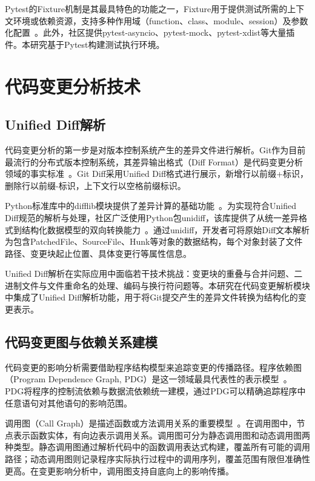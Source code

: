 Pytest的Fixture机制是其最具特色的功能之一，Fixture用于提供测试所需的上下文环境或依赖资源，支持多种作用域（function、class、module、session）及参数化配置~\cite{pytestOfficial}。此外，社区提供pytest-asyncio、pytest-mock、pytest-xdist等大量插件。本研究基于Pytest构建测试执行环境。

\section{代码变更分析技术}
\subsection{Unified Diff解析}
代码变更分析的第一步是对版本控制系统产生的差异文件进行解析。Git作为目前最流行的分布式版本控制系统，其差异输出格式（Diff Format）是代码变更分析领域的事实标准~\cite{ChaconStraub2014}。Git Diff采用Unified Diff格式进行展示，新增行以前缀\textsf{+}标识，删除行以前缀\textsf{-}标识，上下文行以空格前缀标识。

Python标准库中的\textsf{difflib}模块提供了差异计算的基础功能~\cite{PythonDifflib}。为实现符合Unified Diff规范的解析与处理，社区广泛使用Python包\textsf{unidiff}，该库提供了从统一差异格式到结构化数据模型的双向转换能力~\cite{unidiffLibrary}。通过\textsf{unidiff}，开发者可将原始Diff文本解析为包含\textsf{PatchedFile}、\textsf{SourceFile}、\textsf{Hunk}等对象的数据结构，每个对象封装了文件路径、变更块起止位置、具体变更行等属性信息。

Unified Diff解析在实际应用中面临若干技术挑战：变更块的重叠与合并问题、二进制文件与文件重命名的处理、编码与换行符问题等。本研究在代码变更解析模块中集成了Unified Diff解析功能，用于将Git提交产生的差异文件转换为结构化的变更表示。

\subsection{代码变更图与依赖关系建模}
代码变更的影响分析需要借助程序结构模型来追踪变更的传播路径。程序依赖图（Program Dependence Graph, PDG）是这一领域最具代表性的表示模型~\cite{Ferrante1987}。PDG将程序的控制流依赖与数据流依赖统一建模，通过PDG可以精确追踪程序中任意语句对其他语句的影响范围。

调用图（Call Graph）是描述函数或方法调用关系的重要模型~\cite{Grove1995CallGraph}。在调用图中，节点表示函数实体，有向边表示调用关系。调用图可分为静态调用图和动态调用图两种类型。静态调用图通过解析代码中的函数调用表达式构建，覆盖所有可能的调用路径；动态调用图则记录程序实际执行过程中的调用序列，覆盖范围有限但准确性更高。在变更影响分析中，调用图支持自底向上的影响传播。

